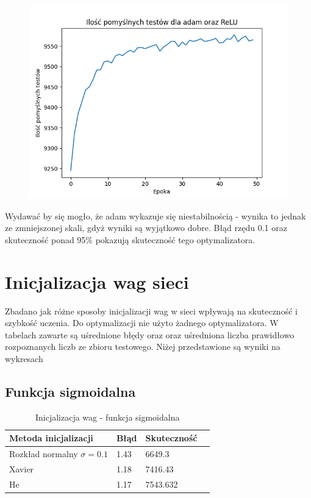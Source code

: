 \documentclass{article}
\begin{document}
\begin{figure}[!htb]
  \centering
  \includegraphics[width=\linewidth]{test_adam_ReLU.png}
\end{figure}

Wydawać by się mogło, że adam wykazuje się niestabilnością - wynika to jednak ze zmniejszonej skali, gdyż wyniki są wyjątkowo dobre.
Błąd rzędu 0.1 oraz skuteczność ponad 95\% pokazują skuteczność tego optymalizatora.

\newpage
\section{Inicjalizacja wag sieci}

Zbadano jak różne sposoby inicjalizacji wag w sieci wpływają na skuteczność i szybkość uczenia. 
Do optymalizacji nie użyto żadnego optymalizatora.
W tabelach zawarte są uśrednione błędy oraz oraz uśredniona liczba prawidłowo rozpoznanych liczb ze
zbioru testowego. Niżej przedstawione są wyniki na wykresach

\subsection{Funkcja sigmoidalna}

\begin{table}[h]
  \centering
    
  \bgroup
  \def\arraystretch{1.3}
  \begin{tabular}{|l|l|l|l|}
  \hline
  Metoda inicjalizacji & Błąd & Skuteczność \\ \hline
  Rozkład normalny $\sigma = 0.1$ & 1.43 & 6649.3 \\ \hline
  Xavier & 1.18 & 7416.43 \\ \hline
  He & 1.17 & 7543.632 \\ \hline
  \end{tabular}
  \egroup
  \vspace{10pt}
  \caption{Inicjalizacja wag - funkcja sigmoidalna}
\end{table}
\end{document}
